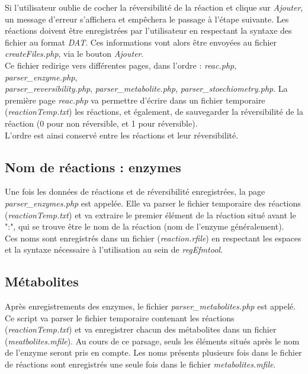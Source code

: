 Si l'utilisateur oublie de cocher la réversibilité de la réaction et clique sur \emph{Ajouter}, un message d'erreur s'affichera et empêchera le passage à l'étape suivante. Les réactions doivent être enregistrées par l'utilisateur en respectant la syntaxe des fichier au format \emph{DAT}. Ces informations vont alors être envoyées au fichier \emph{createFiles.php}, via le bouton \emph{Ajouter}.\\
Ce fichier redirige vers différentes pages, dans l'ordre : \emph{reac.php}, \emph{parser\_enzyme.php},
\\ \emph{parser\_reversibility.php}, \emph{parser\_metabolite.php}, \emph{parser\_stoechiometry.php}.
La première page \emph{reac.php} va permettre d'écrire dans un fichier temporaire (\emph{reactionTemp.txt}) les réactions, et également, de sauvegarder la réversibilité de la réaction (0 pour non réversible, et 1 pour réversible).\\
L'ordre est ainsi conservé entre les réactions et leur réversibilité.

\subsection{Nom de réactions : enzymes}
Une fois les données de réactions et de réversibilité enregistrées, la page \emph{parser\_enzymes.php} est appelée. Elle va parser le fichier temporaire des réactions (\emph{reactionTemp.txt}) et va extraire le premier élément de la réaction situé avant le ":", qui se trouve être le nom de la réaction (nom de l'enzyme généralement).\\
Ces noms sont enregistrés dans un fichier (\emph{reaction.rfile}) en respectant les espaces et la syntaxe nécessaire à l'utilisation au sein de \emph{regEfmtool}.

\subsection{Métabolites}
Après enregistrements des enzymes, le fichier \emph{parser\_metabolites.php} est appelé. Ce script va parser le fichier temporaire contenant les réactions (\emph{reactionTemp.txt}) et va enregistrer chacun des métabolites dans un fichier (\emph{meatbolites.mfile}). Au cours de ce parsage, seuls les éléments situés après le nom de l'enzyme seront pris en compte. Les noms présents plusieurs fois dans le fichier de réactions sont enregistrés une seule fois dans le fichier \emph{metabolites.mfile}.

